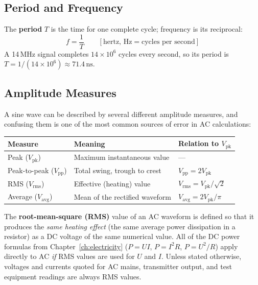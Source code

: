 \subsection{Period and Frequency}

The \textbf{period} $T$ is the time for one complete cycle; frequency is
its reciprocal:
\[
\boxed{f = \frac{1}{T}} \qquad [\text{hertz, Hz} = \text{cycles per second}]
\]
A 14\,MHz signal completes $14\times10^{6}$ cycles every second, so its
period is $T = 1/(14\times10^{6}) \approx 71.4\,\text{ns}$.

\subsection{Amplitude Measures}

A sine wave can be described by several different amplitude measures,
and confusing them is one of the most common sources of error in AC
calculations:

\begin{center}
\begin{tabular}{@{}lll@{}}
\toprule
Measure & Meaning & Relation to $V_{\text{pk}}$ \\
\midrule
Peak ($V_{\text{pk}}$) & Maximum instantaneous value & --- \\
Peak-to-peak ($V_{\text{pp}}$) & Total swing, trough to crest & $V_{\text{pp}} = 2V_{\text{pk}}$ \\
RMS ($V_{\text{rms}}$) & Effective (heating) value & $V_{\text{rms}} = V_{\text{pk}}/\sqrt{2}$ \\
Average ($V_{\text{avg}}$) & Mean of the rectified waveform & $V_{\text{avg}} = 2V_{\text{pk}}/\pi$ \\
\bottomrule
\end{tabular}
\end{center}

\begin{keyidea}
The \textbf{root-mean-square (RMS)} value of an AC waveform is defined so
that it produces the \emph{same heating effect} (the same average power
dissipation in a resistor) as a DC voltage of the same numerical value.
All of the DC power formulas from Chapter~\ref{ch:electricity}
($P=UI$, $P=I^2R$, $P=U^2/R$) apply directly to AC \emph{if} RMS values
are used for $U$ and $I$. Unless stated otherwise, voltages and currents
quoted for AC mains, transmitter output, and test equipment readings are
always RMS values.
\end{keyidea}

